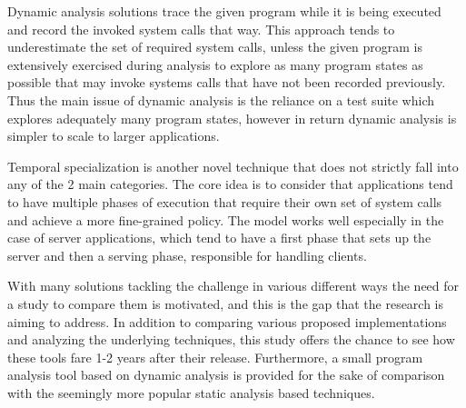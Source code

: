 Dynamic analysis solutions \cite{ref_dyn_1} trace the given program while it is being executed and record the invoked system calls that way. This approach tends to underestimate the set of required system calls, unless the given program is extensively exercised during analysis to explore as many program states as possible that may invoke systems calls that have not been recorded previously. Thus the main issue of dynamic analysis is the reliance on a test suite which explores adequately many program states, however in return dynamic analysis is simpler to scale to larger applications.

Temporal specialization \cite{ref_mp_1} is another novel technique that does not strictly fall into any of the 2 main categories. The core idea is to consider that applications tend to have multiple phases of execution that require their own set of system calls and achieve a more fine-grained policy. The model works well especially in the case of server applications, which tend to have a first phase that sets up the server and then a serving phase, responsible for handling clients.

With many solutions tackling the challenge in various different ways the need for a study to compare them is motivated, and this is the gap that the research is aiming to address. In addition to comparing various proposed implementations and analyzing the underlying techniques, this study offers the chance to see how these tools fare 1-2 years after their release. Furthermore, a small program analysis tool based on dynamic analysis is provided for the sake of comparison with the seemingly more popular static analysis based techniques.
